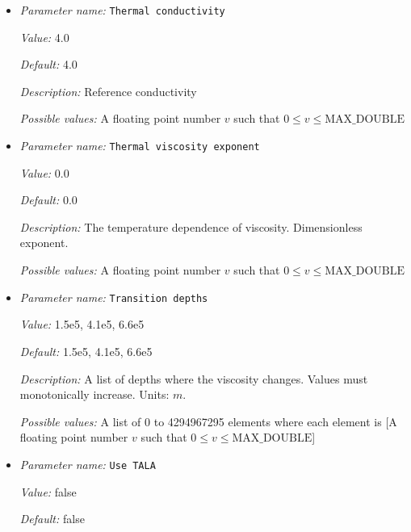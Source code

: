 \begin{itemize}
\item {\it Parameter name:} {\tt Thermal conductivity}
\label{parameters:Material model/Ascii reference profile/Thermal conductivity}


{\it Value:} 4.0


{\it Default:} 4.0


{\it Description:} Reference conductivity


{\it Possible values:} A floating point number $v$ such that $0 \leq v \leq \text{MAX\_DOUBLE}$
\item {\it Parameter name:} {\tt Thermal viscosity exponent}
\label{parameters:Material model/Ascii reference profile/Thermal viscosity exponent}


{\it Value:} 0.0


{\it Default:} 0.0


{\it Description:} The temperature dependence of viscosity. Dimensionless exponent.


{\it Possible values:} A floating point number $v$ such that $0 \leq v \leq \text{MAX\_DOUBLE}$
\item {\it Parameter name:} {\tt Transition depths}
\label{parameters:Material model/Ascii reference profile/Transition depths}


{\it Value:} 1.5e5, 4.1e5, 6.6e5


{\it Default:} 1.5e5, 4.1e5, 6.6e5


{\it Description:} A list of depths where the viscosity changes. Values must monotonically increase. Units: $m$.


{\it Possible values:} A list of 0 to 4294967295 elements where each element is [A floating point number $v$ such that $0 \leq v \leq \text{MAX\_DOUBLE}$]
\item {\it Parameter name:} {\tt Use TALA}
\label{parameters:Material model/Ascii reference profile/Use TALA}


{\it Value:} false


{\it Default:} false



\end{itemize}
